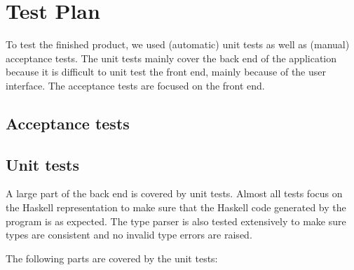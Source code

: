 \chapter{Test Plan}

To test the finished product, we used (automatic) unit tests as well as (manual) acceptance tests.
The unit tests mainly cover the back end of the application because it is difficult to unit test the front end, mainly because of the user interface.
The acceptance tests are focused on the front end.

\section{Acceptance tests}



\section{Unit tests}

A large part of the back end is covered by unit tests.
Almost all tests focus on the Haskell representation to make sure that the Haskell code generated by the program is as expected.
The type parser is also tested extensively to make sure types are consistent and no invalid type errors are raised.

The following parts are covered by the unit tests:


